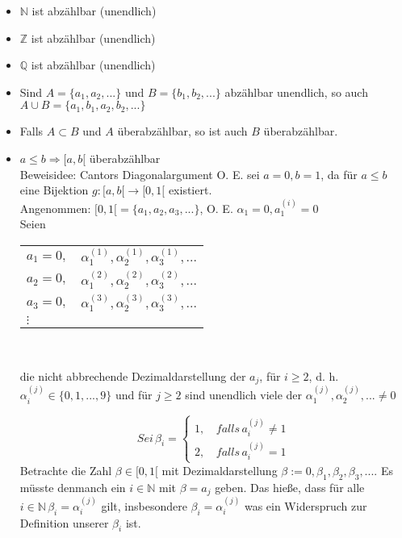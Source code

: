 \begin{itemize}[noitemsep]
	\item $\mathbb{N}$ ist abzählbar (unendlich)
	\item $\mathbb{Z}$ ist abzählbar (unendlich)
	\item $\mathbb{Q}$ ist abzählbar (unendlich)
	\item Sind $A = \{a_1, a_2, ...\}$ und $B = \{b_1, b_2, ...\}$ abzählbar unendlich, so auch \mbox{$A \cup B = \{a_1, b_1, a_2, b_2, ...\}$}
	\item Falls $A \subset B$ und $A$ überabzählbar, so ist auch $B$ überabzählbar.
	\item $a\le b \Rightarrow [a,b[$ überabzählbar\\
Beweisidee: Cantors Diagonalargument O. E. sei $a = 0, b = 1$, da für $a \leq b$ eine Bijektion $g:[a,b[ \rightarrow [0,1[$ existiert.\\
Angenommen: $[0,1[ = \{a_1, a_2, a_3, ...\}$, O. E. $\alpha_1 = 0, a_1^{(i)} = 0$\\

Seien

\begin{centering}
	\begin{tabulary}{\textwidth}{l l}
		$a_1=0,$ & $\alpha_1^{(1)}, \alpha_2^{(1)}, \alpha_3^{(1)}, ...$\\
		$a_2=0,$ & $\alpha_1^{(2)}, \alpha_2^{(2)}, \alpha_3^{(2)}, ...$\\
		$a_3=0,$ & $\alpha_1^{(3)}, \alpha_2^{(3)}, \alpha_3^{(3)}, ...$\\
		$\vdots$ &
	\end{tabulary}\\
\end{centering}
die nicht abbrechende Dezimaldarstellung der $a_j$, für $i\geq 2$, d. h. $\alpha_i^{(j)} \in \{0,1,...,9\}$ und für $j \geq 2$ sind unendlich viele der $\alpha_1^{(j)}, \alpha_2^{(j)},... \neq 0$

\begin{equation*}
	Sei \, \beta_i = \left\{
		\begin{aligned}
		1, \, & falls \, a_i^{(j)} \neq 1\\
		2, \, & falls \, a_i^{(j)} = 1
		\end{aligned}
		\right.
\end{equation*}
Betrachte die Zahl $\beta \in [0,1[$ mit Dezimaldarstellung $\beta := 0,\beta_1, \beta_2, \beta_3, ...$. Es müsste denmanch ein $i \in \mathbb{N}$ mit $\beta = a_j$ geben. Das hieße, dass für alle $i\in \mathbb{N} \, \beta_i = \alpha_i^{(j)}$ gilt, insbesondere $\beta_i = \alpha_i^{(j)}$ was ein Widerspruch zur Definition unserer $\beta_i$ ist. \proofend


\end{itemize}
